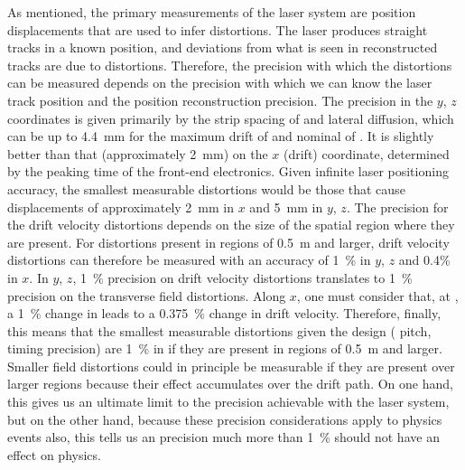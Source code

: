 As mentioned, the primary measurements of the laser system are position displacements that are used to infer \efield distortions.
The laser produces straight tracks in a known position, and deviations from what is seen in reconstructed tracks are due to \efield distortions. Therefore, the precision with which the \efield distortions can be measured depends on the precision with which we can know the laser track position and the  position reconstruction precision.
The  precision in the $y$, $z$ coordinates is given primarily by the  strip spacing of \dpstrippitch and lateral diffusion, which can be up to \SI{4.4}{\milli\m} for the maximum drift of \dpmaxdrift and nominal \efield of \dpnominaldriftfield.
It is slightly better than that (approximately \SI{2}{\milli\m}) on the $x$ (drift) coordinate, determined by the \fepeaktime peaking time of the front-end electronics.
Given infinite laser positioning accuracy, the smallest measurable \efield distortions would be those that cause displacements of approximately \SI{2}{\milli\m} in $x$ and \SI{5}{\milli\m} in $y$, $z$. The precision for the drift velocity distortions depends on the size of the spatial region where they are present. For distortions present in regions of \SI{0.5}{\m} and larger, drift velocity distortions can therefore be measured with an accuracy of \SI{1}{\%} in $y$, $z$ and \num{0.4}\% in $x$. In $y$, $z$, \SI{1}{\%} precision on drift velocity distortions translates to \SI{1}{\%} precision on the transverse field distortions. Along $x$, one must consider that, at \dpnominaldriftfield, a \SI{1}{\%} change in \efield leads to a \SI{0.375}{\%} change in drift velocity. Therefore, finally, this means that the smallest measurable distortions given the  design ( pitch, timing precision) are \SI{1}{\%} in \efield if they are present in regions of \SI{0.5}{\m} and larger. Smaller field distortions could in principle be measurable if they are present over larger regions because their effect accumulates over the drift path.
On one hand, this gives us an ultimate limit to the \efield precision achievable with the laser system, but on the other hand, because these  precision considerations apply to physics events also, this tells us an \efield precision much more than \SI{1}{\%} should not have an effect on physics.

